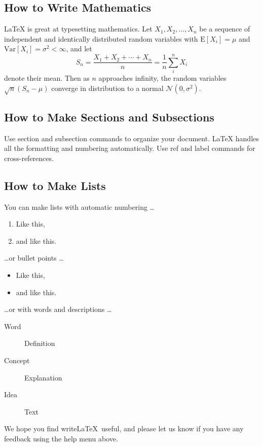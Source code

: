\documentclass[a4paper]{article}
\begin{document}
\subsection{How to Write Mathematics}

\LaTeX{} is great at typesetting mathematics. Let $X_1, X_2, \ldots, X_n$ be a sequence of independent and identically distributed random variables with $\text{E}[X_i] = \mu$ and $\text{Var}[X_i] = \sigma^2 < \infty$, and let
$$S_n = \frac{X_1 + X_2 + \cdots + X_n}{n}
      = \frac{1}{n}\sum_{i}^{n} X_i$$
denote their mean. Then as $n$ approaches infinity, the random variables $\sqrt{n}(S_n - \mu)$ converge in distribution to a normal $\mathcal{N}(0, \sigma^2)$.

\subsection{How to Make Sections and Subsections}

Use section and subsection commands to organize your document. \LaTeX{} handles all the formatting and numbering automatically. Use ref and label commands for cross-references.

\subsection{How to Make Lists}

You can make lists with automatic numbering \dots

\begin{enumerate}
\item Like this,
\item and like this.
\end{enumerate}
\dots or bullet points \dots
\begin{itemize}
\item Like this,
\item and like this.
\end{itemize}
\dots or with words and descriptions \dots
\begin{description}
\item[Word] Definition
\item[Concept] Explanation
\item[Idea] Text
\end{description}

We hope you find write\LaTeX\ useful, and please let us know if you have any feedback using the help menu above.
\end{document}
